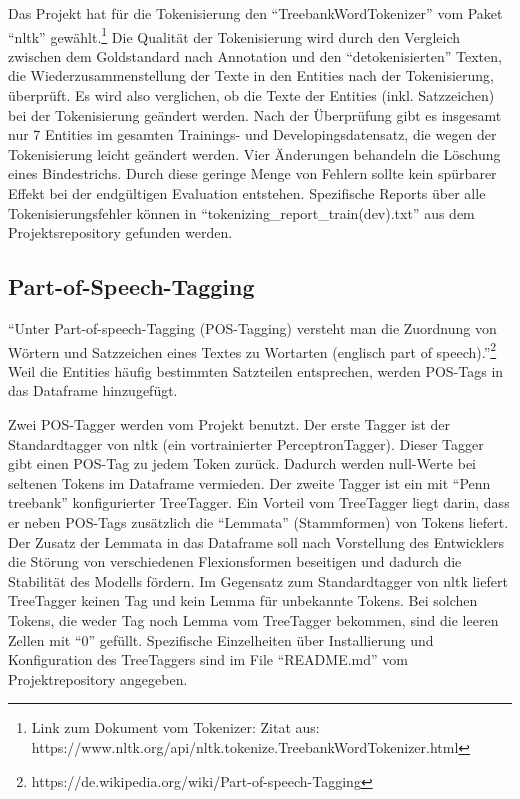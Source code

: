 \documentclass[paper=A4, ngerman, fontsize=12pt]{article}
\begin{document}
	\indent
	Das Projekt hat für die Tokenisierung den \enquote{TreebankWordTokenizer} vom Paket \enquote{nltk} gewählt.\footnote{Link zum Dokument vom Tokenizer: Zitat aus: https://www.nltk.org/api/nltk.tokenize.TreebankWordTokenizer.html} Die Qualität der Tokenisierung wird durch den Vergleich zwischen dem Goldstandard nach Annotation und den \enquote{detokenisierten} Texten, die Wiederzusammenstellung der Texte in den Entities nach der Tokenisierung, überprüft. Es wird also verglichen, ob die Texte der Entities (inkl. Satzzeichen) bei der Tokenisierung geändert werden. Nach der Überprüfung gibt es insgesamt nur 7 Entities im gesamten Trainings- und Developingsdatensatz, die wegen der Tokenisierung leicht geändert werden. Vier Änderungen behandeln die Löschung eines Bindestrichs. Durch diese geringe Menge von Fehlern sollte kein spürbarer Effekt bei der endgültigen Evaluation entstehen. Spezifische Reports über alle Tokenisierungsfehler können in \enquote{tokenizing\_report\_train(dev).txt} aus dem Projektsrepository gefunden werden.

	\subsection{Part-of-Speech-Tagging}
	\noindent
	\enquote{Unter Part-of-speech-Tagging (POS-Tagging) versteht man die Zuordnung von Wörtern und Satzzeichen eines Textes zu Wortarten (englisch part of speech).}\footnote{https://de.wikipedia.org/wiki/Part-of-speech-Tagging} Weil die Entities häufig bestimmten Satzteilen entsprechen, werden POS-Tags in das Dataframe hinzugefügt. 
	
	\indent
	Zwei POS-Tagger werden vom Projekt benutzt. Der erste Tagger ist der Standardtagger von nltk (ein vortrainierter PerceptronTagger). Dieser Tagger gibt einen POS-Tag zu jedem Token zurück. Dadurch werden null-Werte bei seltenen Tokens im Dataframe vermieden. Der zweite Tagger ist ein mit \enquote{Penn treebank} konfigurierter TreeTagger. Ein Vorteil vom TreeTagger liegt darin, dass er neben POS-Tags zusätzlich die \enquote{Lemmata} (Stammformen) von Tokens liefert. Der Zusatz der Lemmata in das Dataframe soll nach Vorstellung des Entwicklers die Störung von verschiedenen Flexionsformen beseitigen und dadurch die Stabilität des Modells fördern. Im Gegensatz zum Standardtagger von nltk liefert TreeTagger keinen Tag und kein Lemma für unbekannte Tokens. Bei solchen Tokens, die weder Tag noch Lemma vom TreeTagger bekommen, sind die leeren Zellen mit \enquote{0} gefüllt. Spezifische Einzelheiten über Installierung und Konfiguration des TreeTaggers sind im File \enquote{README.md} vom Projektrepository angegeben. 
	
\end{document}
